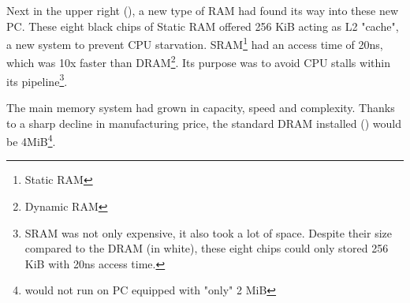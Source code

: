 \par
 Next in the upper right (), a new type of RAM had found its way into these new PC. These eight black chips of Static RAM offered 256 KiB acting as L2 "cache", a new system to prevent CPU starvation. SRAM\footnote{Static RAM} had an access time of 20ns, which was 10x faster than DRAM\footnote{Dynamic RAM}. Its purpose was to avoid CPU stalls within its pipeline\footnote{SRAM was not only expensive, it also took a lot of space. Despite their size compared to the DRAM (in white), these eight chips could only stored 256 KiB with 20ns access time.}. \\
\par
The main memory system had grown in capacity, speed and complexity. Thanks to a sharp decline in manufacturing price, the standard DRAM installed () would be 4MiB\footnote{\doom would not run on PC equipped with "only" 2 MiB}.



